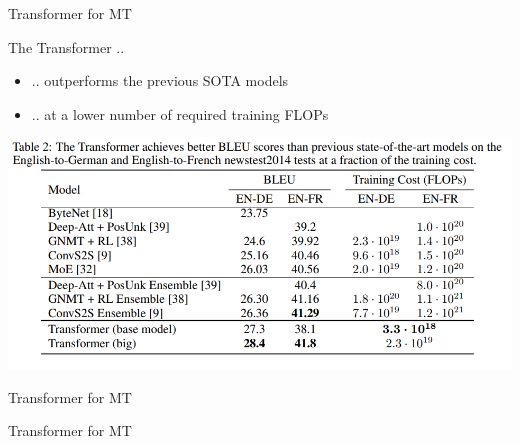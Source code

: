 \begin{vbframe}{Transformer for MT}

\vfill

The Transformer .. 

\begin{itemize}
	\item .. outperforms the previous SOTA models
	\item .. at a lower number of required training FLOPs
\end{itemize}

\vspace{.3cm}

\includegraphics[width=.9\textwidth]{figure/trafo-wmt}

\vfill

\end{vbframe}


\begin{vbframe}{Transformer for MT}

\end{vbframe}


\begin{vbframe}{Transformer for MT}

\end{vbframe}


\endlecture

